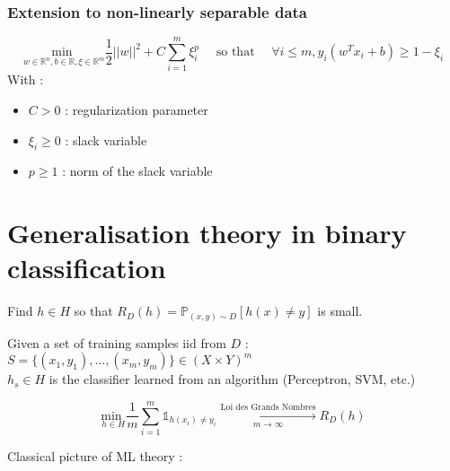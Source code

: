 \documentclass[12pt,a4paper]{article}
\newcommand{\propriete}[2]{%
    \begin{tcolorbox}[colback=white,colframe=green!25!white,title=\textbf{Propriété #1}, coltitle=black]
        #2
    \end{tcolorbox}
}
\newcommand{\important}[1]{%
    \begin{tcolorbox}[colback=red!10!white,colframe=red!30!black]
        #1
    \end{tcolorbox}
}
\begin{document}
\subsubsection{Extension to non-linearly separable data}

\important{
    \begin{equation}
        \underset{w \in \mathbb{R}^n, b \in \mathbb{R}, \xi \in \mathbb{R}^m}{\text{min }} \frac{1}{2} ||w||^2 + C \sum_{i = 1}^m \xi_i^p \quad \text{ so that } \quad \forall i \leq m, y_i(w^T x_i + b) \geq 1 - \xi_i
    \end{equation}
    With :
    \begin{itemize}
        \item $C > 0$ : regularization parameter
        \item $\xi_i \geq 0$ : slack variable
        \item $p \geq 1$ : norm of the slack variable
    \end{itemize}
}

\section{Generalisation theory in binary classification}

\important{
    Find $h \in H$ so that $R_D(h) = \mathbb{P}_{(x, y) \sim D} [h(x) \neq y]$ is small.\\
} 

Given a set of training samples iid from $D$ : $S = \{(x_1, y_1), \dots, (x_m, y_m)\} \in (X \times Y)^m$\\
$h_s \in H$ is the classifier learned from an algorithm (Perceptron, SVM, etc.)\\

\propriete{}{
    \begin{equation}
        \underset{h \in H}{\text{min }} \frac{1}{m} \sum_{i = 1}^m \mathds{1}_{h(x_i) \neq y_i} \xrightarrow[m \to \infty]{\text{Loi des Grands Nombres}} R_D(h)
    \end{equation}
}

Classical picture of ML theory :\\

\end{document}
